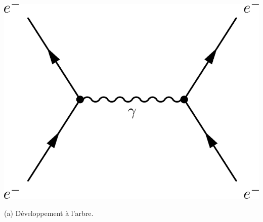 \begin{minipagewithmarginpars}[h]{\textwidth}
\vspace{-0.5cm}
\centering
\hspace*{-1.5cm}

\label{bestiaire}
\marginpar
{
\vspace*{1.5cm}
\centering
\includegraphics[width=\marginparwidth]{SM/feyn0.png}
\begin{center}\normalfont\small {(a) Développement à l'arbre.}\end{center}
}
\end{minipagewithmarginpars}
